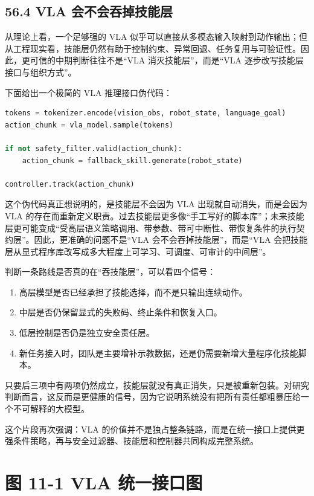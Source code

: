 \subsection*{56.4 VLA 会不会吞掉技能层}


从理论上看，一个足够强的 VLA 似乎可以直接从多模态输入映射到动作输出；但从工程现实看，技能层仍然有助于控制约束、异常回退、任务复用与可验证性。因此，更可信的中期判断往往不是“VLA 消灭技能层”，而是“VLA 逐步改写技能层接口与组织方式”。

下面给出一个极简的 VLA 推理接口伪代码：

\begin{lstlisting}[language=python]
tokens = tokenizer.encode(vision_obs, robot_state, language_goal)
action_chunk = vla_model.sample(tokens)

if not safety_filter.valid(action_chunk):
    action_chunk = fallback_skill.generate(robot_state)

controller.track(action_chunk)
\end{lstlisting}

这个伪代码真正想说明的，是技能层不会因为 VLA 出现就自动消失，而是会因为 VLA 的存在而重新定义职责。过去技能层更多像“手工写好的脚本库”；未来技能层更可能变成“受高层语义策略调用、带参数、带可中断性、带恢复条件的执行契约层”。因此，更准确的问题不是“VLA 会不会吞掉技能层”，而是“VLA 会把技能层从显式程序库改写成多大程度上可学习、可调度、可审计的中间层”。

判断一条路线是否真的在“吞技能层”，可以看四个信号：

\begin{enumerate}
\item 高层模型是否已经承担了技能选择，而不是只输出连续动作。
\item 中层是否仍保留显式的失败码、终止条件和恢复入口。
\item 低层控制是否仍是独立安全责任层。
\item 新任务接入时，团队是主要增补示教数据，还是仍需要新增大量程序化技能脚本。
\end{enumerate}

只要后三项中有两项仍然成立，技能层就没有真正消失，只是被重新包装。对研究判断而言，这反而是更健康的信号，因为它说明系统没有把所有责任都粗暴压给一个不可解释的大模型。

这个片段再次强调：VLA 的价值并不是独占整条链路，而是在统一接口上提供更强条件策略，再与安全过滤器、技能层和控制器共同构成完整系统。

\section*{图 11-1 VLA 统一接口图}


